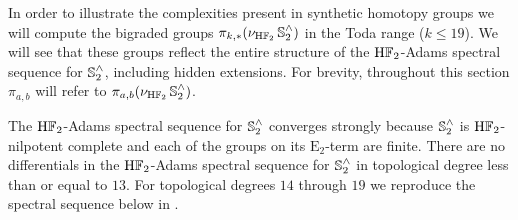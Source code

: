 In order to illustrate the complexities present in synthetic homotopy groups we will compute the bigraded groups $\pi_{k,*}(\nu_{\mathrm{H}\mathbb{F}_2} \operatorname{\mathbb{S}}^{\wedge} _2)$ in the Toda range ($k \leq 19$).
We will see that these groups reflect the entire structure of the $\mathrm{H}\mathbb{F}_2$-Adams spectral sequence for $\operatorname{\mathbb{S}}^{\wedge} _2$, including hidden extensions.
For brevity, throughout this section $\pi_{a,b}$ will refer to $\pi_{a,b}(\nu_{\mathrm{H}\mathbb{F}_2} \operatorname{\mathbb{S}}^\wedge_2)$.

The $\mathrm{H}\mathbb{F}_2$-Adams spectral sequence for $\operatorname{\mathbb{S}}^\wedge_2$ converges strongly because $\operatorname{\mathbb{S}}^\wedge_2$ is $\mathrm{H}\mathbb{F}_2$-nilpotent complete and each of the groups on its $\mathrm{E}_2$-term are finite.
There are no differentials in the $\mathrm{H}\mathbb{F}_2$-Adams spectral sequence for $\operatorname{\mathbb{S}}^{\wedge} _2$ in topological degree less than or equal to $13$.
For topological degrees $14$ through $19$ we reproduce the spectral sequence below in .




  
  


